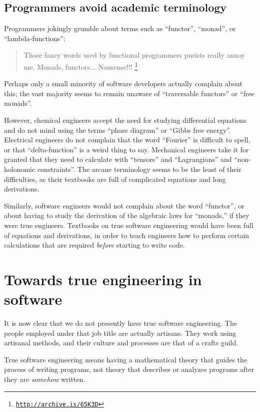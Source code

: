 \subsection{Programmers avoid academic terminology }

Programmers jokingly grumble about terms such as ``functor'', ``monad'',
or ``lambda-functions'':
\begin{quote}
{\small{}Those fancy words used by functional programmers purists
really annoy me. Monads, functors... Nonsense!!! }\footnote{\texttt{\href{http://archive.is/65K3D}{http://archive.is/65K3D}}}
\end{quote}
Perhaps only a small minority of software developers actually complain
about this; the vast majority seems to remain unaware of ``traversable
functors'' or ``free monads''.

However, chemical engineers accept the need for studying differential
equations and do not mind using the terms ``phase diagram'' or ``Gibbs
free energy''. Electrical engineers do not complain that the word
``Fourier'' is difficult to spell, or that ``delta-function''
is a weird thing to say. Mechanical engineers take it for granted
that they need to calculate with ``tensors'' and ``Lagrangians''
and ``non-holonomic constraints''. The arcane terminology seems
to be the least of their difficulties, as their textbooks are full
of complicated equations and long derivations.

Similarly, software engineers would not complain about the word ``functor'',
or about having to study the derivation of the algebraic laws for
``monads,'' \textemdash{} if they were true engineers. Textbooks
on true software engineering would have been full of equations and
derivations, in order to teach engineers how to perform certain calculations
that are required \emph{before} starting to write code.

\section{Towards true engineering in software}

It is now clear that we do not presently have true software engineering.
The people employed under that job title are actually artisans. They
work using artisanal methods, and their culture and processes are
that of a crafts guild.

True software engineering means having a mathematical theory that
guides the process of writing programs, \textemdash{} not theory that
describes or analyzes programs after they are \emph{somehow} written.

